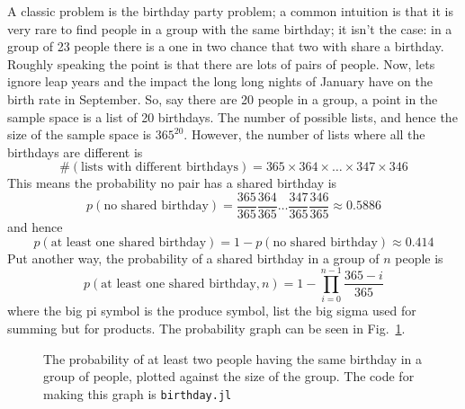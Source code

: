 \documentclass[11pt,a4paper]{scrartcl}
\begin{document}
A classic problem is the birthday party problem; a common intuition is
that it is very rare to find people in a group with the same birthday;
it isn't the case: in a group of 23 people there is a one in two
chance that two with share a birthday. Roughly speaking the point is that
there are lots of pairs of people. Now, lets ignore leap years and the
impact the long long nights of January have on the birth rate in
September. So, say there are 20 people in a
group, a point in the sample space is a list of 20 birthdays. The
number of possible lists, and hence the size of the sample space is
$365^{20}$. However, the number of lists where all the birthdays are
different is
\begin{equation}
\#(\mbox{lists with different birthdays})=365\times 364 \times \ldots \times 347 \times 346
\end{equation}
This means the probability no pair has a shared birthday is
\begin{equation}
p(\mbox{no shared birthday})=\frac{365}{365}\frac{364}{365}\ldots\frac{347}{365}\frac{346}{365}\approx 0.5886
\end{equation}
and hence
\begin{equation}
p(\mbox{at least one shared birthday})=1-p(\mbox{no shared birthday})\approx 0.414
\end{equation}
Put another way, the probability of a shared birthday in a group of $n$ people is
\begin{equation}
p(\mbox{at least one shared birthday},n)=1-\prod_{i=0}^{n-1}\frac{365-i}{365}
\end{equation}
where the big pi symbol is the produce symbol, list the big sigma used
for summing but for products. The probability graph can be seen in Fig.~\ref{fig_birthday}.


\begin{figure}[thb]
\begin{center}

\end{center}
\caption{The probability of at least two people having the same birthday in a group of people, plotted against the size of the group. The code for making this graph is \texttt{birthday.jl}\label{fig_birthday}}
\end{figure}
\end{document}
